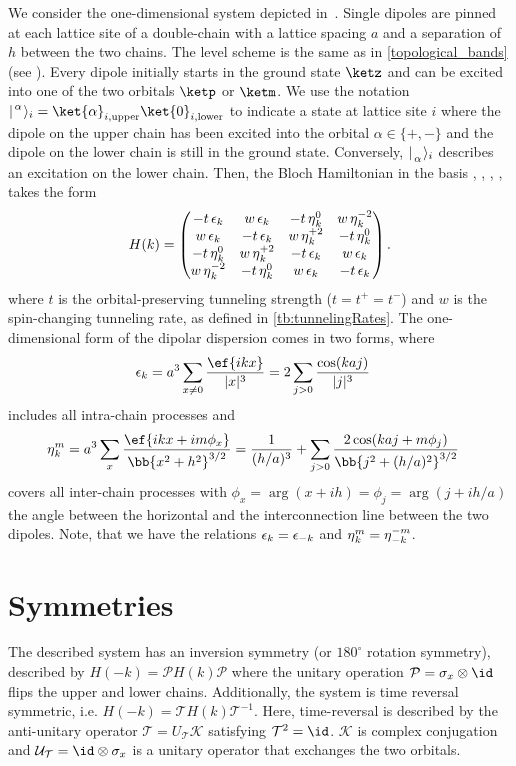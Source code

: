 We consider the one-dimensional system depicted in~.
Single dipoles are pinned at each lattice site of a double-chain with a lattice spacing $a$ and a separation of $h$ between the two chains.
The level scheme is the same as in \cref{topological_bands} (see ). Every dipole initially starts in the ground state $\ketz$ and can be excited into one of the two orbitals $\ketp$ or $\ketm$.
We use the notation $\ladderKet{\alpha}{}_i = \ket{\alpha}_{i,\text{upper}} \ket{0}_{i,\text{lower}}$ to indicate a state at lattice site $i$ where the dipole on the upper chain has been excited into the orbital $\alpha \in \{+, -\}$ and the dipole on the lower chain is still in the ground state.
Conversely, $\ladderKet{}{\alpha}_i$ describes an excitation on the lower chain.
Then, the Bloch Hamiltonian in the basis \upp, \upm, \dnp, \dnm, takes the form
\begin{align}
    H(k) =
    \begin{pmatrix}
        -t \operatorname{\epsilon}_k  & w \operatorname{\epsilon}_k & -t \operatorname{\eta}^0_k & w \operatorname{\eta}^{-2}_k \\
        w \operatorname{\epsilon}_k & -t \operatorname{\epsilon}_k  & w \operatorname{\eta}^{+2}_k & -t \operatorname{\eta}^0_k \\
        -t \operatorname{\eta}^0_{k} & w \operatorname{\eta}^{+2}_{k}  & -t \operatorname{\epsilon}_k  & w \operatorname{\epsilon}_k \\
        w \operatorname{\eta}^{-2}_{k} & -t \operatorname{\eta}^0_{k} & w \operatorname{\epsilon}_k & -t \operatorname{\epsilon}_k
    \end{pmatrix}.
\end{align}
where $t$ is the orbital-preserving tunneling strength ($t = t^+ = t^-$) and $w$ is the spin-changing tunneling rate, as defined in \cref{tb:tunnelingRates}.
The one-dimensional form of the dipolar dispersion comes in two forms, where
\begin{align}
    \ep_k &= a^3 \sum_{x\ne 0} \frac{\ef{i k x}}{|x|^3} = 2 \sum_{j>0} \frac{\cos(k a j)}{|j|^3}
\end{align}
includes all intra-chain processes and
\begin{align}
    \et^m_k &= a^3 \sum_{x} \frac{\ef{i k x + i m \phi_x}}{\bb{x^2 + h^2}^{3/2}}
    = \frac{1}{(h/a)^3} + \sum_{j>0} \frac{2\cos(ka j+m\phi_j)}{\bb{j^2+(h/a)^2}^{3/2}}
\end{align}
covers all inter-chain processes with $\phi_x = \arg(x+ i h)=\phi_j=\arg(j+ i h/a)$ the angle between the horizontal and the interconnection line between the two dipoles.
Note, that we have the relations $\operatorname{\epsilon}_k=\operatorname{\epsilon}_{-k}$ and $\operatorname{\eta}^m_k=\operatorname{\eta}^{-m}_{-k}$.

\section{Symmetries}
The described system has an inversion symmetry (or $180^\circ$ rotation symmetry), described by $H(-k) = \mathcal{P} H(k) \mathcal{P}$ where the unitary operation $\mathcal{P} = \sigma_x \otimes \id$ flips the upper and lower chains.
Additionally, the system is time reversal symmetric, i.e. $H(-k)=\mathcal{T} H(k) \mathcal{T}^{-1}$.
Here, time-reversal is described by the anti-unitary operator $\mathcal{T}=U_\mathcal{T} \mathcal{K}$ satisfying $\mathcal{T}^2 = \id$. $\mathcal{K}$ is complex conjugation and $\mathcal{U}_\mathcal{T} = \id \otimes \sigma_x$ is a unitary operator that exchanges the two orbitals.

